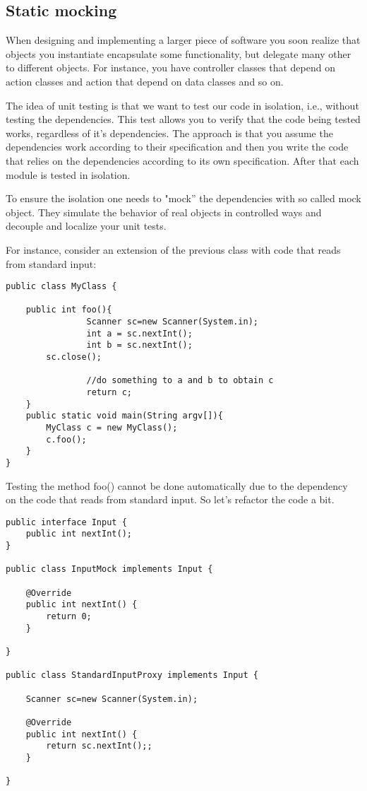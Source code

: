 \documentclass{article}
\begin{document}
\subsection{Static mocking}

When designing and implementing a larger piece of software you soon
realize that objects you instantiate encapsulate some functionality, but
delegate many other to different objects. For instance, you have controller
classes that depend on action classes and action that depend on data
classes and so on.

The idea of unit testing is that we want to test our code in
isolation, i.e., without testing the dependencies. This test allows
you to verify that the code being tested works, regardless of it's
dependencies. The approach is that you assume the dependencies work
according to their specification and then you write the code that
relies on the dependencies according to its own specification.
After that each module is tested in isolation.

To ensure the isolation one needs to "mock'' the dependencies with so
called mock object. They simulate the behavior of real objects in
controlled ways and decouple and localize your unit tests.

For instance, consider an extension of the previous class with code
that reads from standard input:


\begin{lstlisting}
public class MyClass {

	public int foo(){
                Scanner sc=new Scanner(System.in);
                int a = sc.nextInt();
                int b = sc.nextInt();
		sc.close();

                //do something to a and b to obtain c
                return c;
	}
	public static void main(String argv[]){
		MyClass c = new MyClass();
		c.foo();
	}	
}
\end{lstlisting}

Testing the method foo() cannot be done automatically due to the
dependency on the code that reads from standard input. So let's
refactor the code a bit.

\begin{lstlisting}
public interface Input {
	public int nextInt();
}

public class InputMock implements Input {

	@Override
	public int nextInt() {
		return 0;
	}

}

public class StandardInputProxy implements Input {

	Scanner sc=new Scanner(System.in);

	@Override
	public int nextInt() {
		return sc.nextInt();;		
	}

}
\end{lstlisting}
\end{document}
